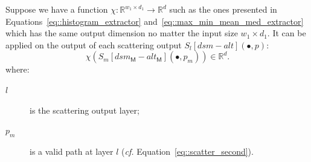             Suppose we have a function \(\chi: \mathbb{R}^{w_1 \times d_1} \rightarrow \mathbb{R}^d\) such as the ones presented in Equations~\ref{eq::histogram_extractor} and~\ref{eq::max_min_mean_med_extractor} which has the same output dimension no matter the input size \(w_1 \times d_1\).
            It can be applied on the output of each scattering output \(S_l[dsm - alt](\bullet, p)\):
            \begin{equation}
                \label{eq::reduced_scattering}
                \chi \left(S_m[dsm_{\mathsf{M}} - alt_{\mathsf{M}}]\left(\bullet, p_m\right)\right) \in \mathbb{R}^d.
            \end{equation}
            where:
            \begin{description}
                \item[\(l\)] is the scattering output layer;
                \item[\(p_m\)] is a valid path at layer \(l\) (\textit{cf.} Equation~\ref{eq::scatter_second}). 
            \end{description}
            
